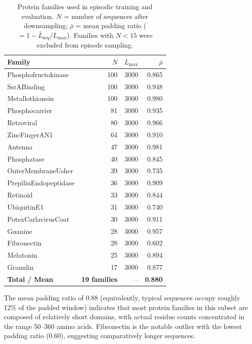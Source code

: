 \documentclass[11pt,a4paper]{article}
\begin{document}
\begin{table}[H]
\centering
\caption{Protein families used in episodic training and evaluation.
  $N$ = number of sequences after downsampling;
  $\bar{\rho}$ = mean padding ratio ($=1 - \bar{L}_{\text{seq}}/L_{\max}$).
  Families with $N < 15$ were excluded from episode sampling.}
\label{tab:family_stats}
\small
\setlength{\tabcolsep}{7pt}
\begin{tabular}{lrrr}
\toprule
\textbf{Family} & $N$ & $L_{\max}$ & $\bar{\rho}$ \\
\midrule
Phosphofructokinase  & 100 & 3000 & 0.865 \\
SsrABinding          & 100 & 3000 & 0.948 \\
Metallothionein      & 100 & 3000 & 0.980 \\
Phosphocarrier       &  81 & 3000 & 0.935 \\
Retroviral           &  80 & 3000 & 0.966 \\
ZincFingerAN1        &  64 & 3000 & 0.910 \\
Antenna              &  47 & 3000 & 0.981 \\
Phosphatase          &  40 & 3000 & 0.845 \\
OuterMembraneUsher   &  39 & 3000 & 0.735 \\
PrepilinEndopeptidase&  36 & 3000 & 0.909 \\
Retinoid             &  33 & 3000 & 0.844 \\
UbiquitinE1          &  31 & 3000 & 0.740 \\
PotexCarlavirusCoat  &  30 & 3000 & 0.911 \\
Guanine              &  28 & 3000 & 0.957 \\
Fibronectin          &  28 & 3000 & 0.602 \\
Melatonin            &  25 & 3000 & 0.894 \\
Granulin             &  17 & 3000 & 0.877 \\
\midrule
\textbf{Total / Mean} & \textbf{19 families} & -- & \textbf{0.880} \\
\bottomrule
\end{tabular}
\end{table}

The mean padding ratio of 0.88 (equivalently, typical sequences occupy roughly
12\% of the padded window) indicates that most protein families in this subset
are composed of relatively short domains, with actual residue counts concentrated
in the range 50--360 amino acids.  Fibronectin is the notable outlier with the
lowest padding ratio (0.60), suggesting comparatively longer sequences.
\end{document}
